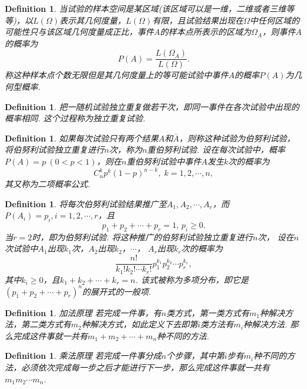\documentclass{article}
\newtheorem{definition}[theorem]{Definition}
\begin{document}
\begin{definition}
\rm 当试验的样本空间是某区域(该区域可以是一维，二维或者三维等等)，以$L(\Omega)$表示其几何度量，$L(\Omega)$有限，{\color{red}且试验结果出现在$\Omega$中任何区域的可能性只与该区域几何度量成正比}，事件$A$的样本点所表示的区域为$\Omega_A$，则事件$A$的概率为
$$
P(A) = \frac{L(\Omega_A)}{L(\Omega)}.
$$
称这种样本点个数无限但是其几何度量上的等可能试验中事件$A$的概率$P(A)$为{\color{red}几何型概率}.
\end{definition}

\begin{definition}
\rm 把一随机试验独立重复做若干次，即同一事件在各次试验中出现的概率相同. 这个过程称为{\color{red}独立重复试验}.
\end{definition}

\begin{definition}
\rm 如果每次试验只有两个结果$A$和$\bar{A}$，则称这种试验为{\color{red}伯努利试验}，将伯努利试验独立重复进行$n$次，称为{\color{red}$n$重伯努利试验}. 设在每次试验中，概率$P(A)=p~(0<p<1)$，则在$n$重伯努利试验中事件$A$发生$k$次的概率为
$$
C_n^kp^k(1-p)^{n-k},\; k=1,2,\cdots,n,
$$
其又称为{\color{red}二项概率公式}.
\end{definition}

\begin{definition}
\rm 将每次伯努利试验结果推广至$A_1,A_2,\cdots,A_r$，而$P(A_i) = p_i, i = 1,2,\cdots,r$，且
$$
p_1 + p_2 + \cdots + p_r = 1, \,p_i \geq 0.
$$
当$r=2$时，即为伯努利试验. 将这种推广的伯努利试验独立重复进行$n$次， 设在$n$次试验中$A_1$出现$k_1$次，$A_2$出现$k_2$，$\cdots$， $A_r$出现$k_r$次的概率为
$$
\frac{n!}{k_1!k_2!\cdots k_r!}p_1^{k_1}p_2^{k_2}\cdots p_r^{k_r},
$$
其中$k_i \geq 0$，且$k_1 + k_2 + \cdots + k_r = n$. 该式被称为{\color{red}多项分布}，即它是$(p_1+p_2 + \cdots + p_r)^n$的展开式的一般项. 
\end{definition}

\begin{definition}
\rm {\color{red} 加法原理} 若完成一件事，有$n$类方式，第一类方式有$m_1$种解决方法，第二类方式有$m_2$种解决方式，如此定义下去即第$i$类方法有$m_i$种解决方法. 那么完成这件事就一共有$m_1 + m_2 + \cdots + m_n$种不同的方法. 
\end{definition}

\begin{definition}
\rm {\color{red} 乘法原理} 若完成一件事分成$n$个步骤，其中第$i$步有$m_i$种不同的方法，必须依次完成每一步之后才能进行下一步，那么完成这件事就一共有$m_1m_2\cdots m_n$.
\end{definition}
\end{document}
